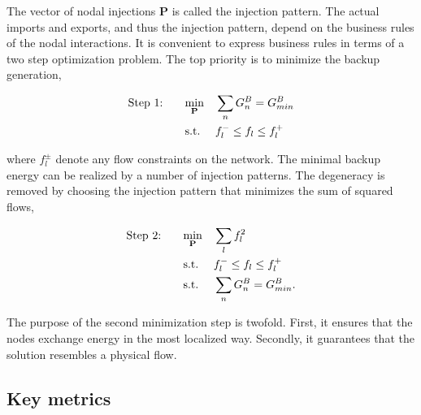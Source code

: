 \documentclass[a4paper, 12pt, sort&compress]{elsarticle}%
\begin{document}
The vector of nodal injections $\mathbf{P}$ is called the injection
pattern. The actual imports and exports, and thus the injection
pattern, depend on the business rules of the nodal interactions. It is
convenient to express business rules in terms of a two step
optimization problem. The top priority is to minimize the backup
generation,

\begin{equation}
  \label{eq:step1}
  \begin{aligned}
    \text{Step 1: \hspace{15pt}}& \underset{\mathbf{P}}{\text{min}}
    & & \sum_{n} G_{n}^{B} = G^{B}_{min} \\
    & \text{s.t.}
    & & f_{l}^{-} \leq f_{l} \leq f_{l}^{+}
  \end{aligned}
\end{equation}

where $f_{l}^{\pm}$ denote any flow constraints on the network.  The
minimal backup energy can be realized by a number of injection
patterns. The degeneracy is removed by choosing the injection pattern
that minimizes the sum of squared flows,

\begin{equation}
  \begin{aligned}
    \label{eq:step2}
    \text{Step 2: \hspace{15pt}} & \underset{\mathbf{P}}{\text{min}}
    & & \sum_{l} f_{l}^{2} \\
    & \text{s.t.}
    & & f_{l}^{-} \leq f_{l} \leq f_{l}^{+} \\
    & \text{s.t.}
    & & \sum_{n} G_{n}^{B} = G^{B}_{min} .
  \end{aligned}
\end{equation}

The purpose of the second minimization step is twofold. First, it
ensures that the nodes exchange energy in the most localized
way. Secondly, it guarantees that the solution resembles a physical
flow\cite{Magnus}. %

\subsection{Key metrics}
\end{document}
